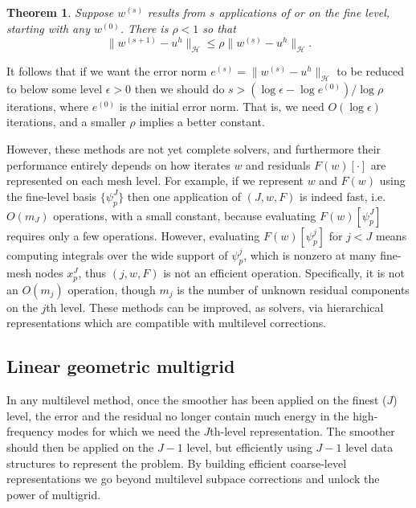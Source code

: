 \documentclass[letterpaper,final,12pt,reqno]{amsart}
\theoremstyle{claim}
\newtheorem*{theorem}{Theorem}
\newcommand{\eps}{\epsilon}
\numberwithin{equation}{section}
\numberwithin{figure}{section}
\numberwithin{table}{section}
\begin{document}
\begin{theorem} \cite[Thm.~3.10]{GraeserKornhuber2009}  Suppose $w^{(s)}$  results from $s$ applications of  or  on the fine level, starting with any $w^{(0)}$.  There is $\rho<1$ so that
\begin{equation}
  \|w^{(s+1)} - u^h\|_{\mathcal{H}} \le \rho \|w^{(s)} - u^h\|_{\mathcal{H}}.  \label{eq:mscconvergence}
\end{equation}
\end{theorem}

It follows that if we want the error norm $e^{(s)} = \|w^{(s)}-u^h\|_{\mathcal{H}}$ to be reduced to below some level $\eps>0$ then we should do $s>(\log\eps - \log e^{(0)})/\log \rho$ iterations, where $e^{(0)}$ is the initial error norm.  That is, we need $O(\log\eps)$ iterations, and a smaller $\rho$ implies a better constant.

However, these  methods are not yet complete solvers, and furthermore their performance entirely depends on how iterates $w$ and residuals $F(w)[\cdot]$ are represented on each mesh level.  For example, if we represent $w$ and $F(w)$ using the fine-level basis $\{\psi_p^J\}$ then one application of $(J,w,F)$ is indeed fast, i.e.~$O(m_J)$ operations, with a small constant, because evaluating $F(w)[\psi_p^J]$ requires only a few operations.  However, evaluating $F(w)[\psi_p^j]$ for $j<J$ means computing integrals over the wide support of $\psi_p^j$, which is nonzero at many fine-mesh nodes $x_p^J$, thus $(j,w,F)$ is not an efficient operation.  Specifically, it is not an $O(m_j)$ operation, though $m_j$ is the number of unknown residual components on the $j$th level.  These  methods can be improved, as solvers, via hierarchical representations which are compatible with multilevel corrections.

\subsection*{Linear geometric multigrid}  In any multilevel method, once the smoother has been applied on the finest ($J$) level, the error and the residual no longer contain much energy in the high-frequency modes for which we need the $J$th-level representation.  The smoother should then be applied on the $J-1$ level, but efficiently using $J-1$ level data structures to represent the problem.  By building efficient coarse-level representations we go beyond multilevel subpace corrections and unlock the power of multigrid.
\end{document}
